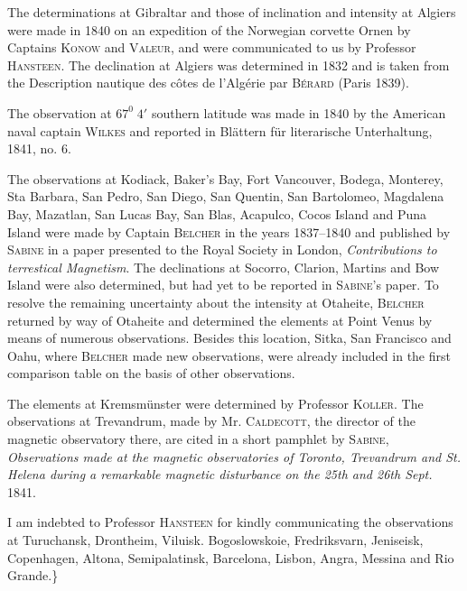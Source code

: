 The determinations at Gibraltar and those of inclination and intensity at Algiers were made in 1840 on an expedition of the Norwegian corvette Ornen by Captains \textsc{Konow} and \textsc{Valeur}, and were communicated to us by Professor \textsc{Hansteen}. The declination at Algiers was determined in 1832 and is taken from the Description nautique des côtes de l’Algérie par \textsc{Bérard} (Paris 1839).

The observation at $67^0\;4'$ southern latitude was made in 1840 by the American naval captain \textsc{Wilkes} and reported in Blättern für literarische Unterhaltung, 1841, no. 6.

The observations at Kodiack, Baker’s Bay, Fort Vancouver, Bodega, Monterey, Sta Barbara, San Pedro, San Diego, San Quentin, San Bartolomeo, Magdalena Bay, Mazatlan, San Lucas Bay, San Blas, Acapulco, Cocos Island and Puna Island were made by Captain \textsc{Belcher} in the years 1837–1840 and published by \textsc{Sabine} in a paper presented to the Royal Society in London, \textit{Contributions to terrestical Magnetism}. The declinations at Socorro, Clarion, Martins and Bow Island were also determined, but had yet to be reported in \textsc{Sabine}’s paper. To resolve the remaining uncertainty about the intensity at Otaheite, \textsc{Belcher} returned by way of Otaheite and determined the elements at Point Venus by means of numerous observations. Besides this location, Sitka, San Francisco and Oahu, where \textsc{Belcher} made new observations, were already included in the first comparison table on the basis of other observations.

The elements at Kremsmünster were determined by Professor \textsc{Koller}. The observations at Trevandrum, made by Mr. \textsc{Caldecott}, the director of the magnetic observatory there, are cited in a short pamphlet by \textsc{Sabine}, \textit{Observations made at the magnetic observatories of Toronto, Trevandrum and St. Helena during a remarkable magnetic disturbance on the 25th and 26th Sept.} 1841.

I am indebted to Professor \textsc{Hansteen} for kindly communicating the observations at Turuchansk, Drontheim, Viluisk. Bogoslowskoie, Fredriksvarn, Jeniseisk, Copenhagen, Altona, Semipalatinsk, Barcelona, Lisbon, Angra, Messina and Rio Grande.\}
